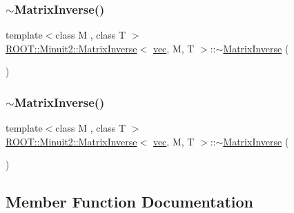 \subsubsection{\texorpdfstring{$\sim$MatrixInverse()}{~MatrixInverse()}\hspace{0.1cm}{\footnotesize\ttfamily [1/2]}}
{\footnotesize\ttfamily template$<$class M , class T $>$ \\
\mbox{\hyperlink{classROOT_1_1Minuit2_1_1MatrixInverse}{R\+O\+O\+T\+::\+Minuit2\+::\+Matrix\+Inverse}}$<$ \mbox{\hyperlink{classROOT_1_1Minuit2_1_1vec}{vec}}, M, T $>$\+::$\sim$\mbox{\hyperlink{classROOT_1_1Minuit2_1_1MatrixInverse}{Matrix\+Inverse}} (\begin{DoxyParamCaption}{ }\end{DoxyParamCaption})\hspace{0.3cm}{\ttfamily [inline]}}

\mbox{\label{classROOT_1_1Minuit2_1_1MatrixInverse_3_01vec_00_01M_00_01T_01_4_ad267e62bc46dd1bab57b3194bd850be9}} 
\subsubsection{\texorpdfstring{$\sim$MatrixInverse()}{~MatrixInverse()}\hspace{0.1cm}{\footnotesize\ttfamily [2/2]}}
{\footnotesize\ttfamily template$<$class M , class T $>$ \\
\mbox{\hyperlink{classROOT_1_1Minuit2_1_1MatrixInverse}{R\+O\+O\+T\+::\+Minuit2\+::\+Matrix\+Inverse}}$<$ \mbox{\hyperlink{classROOT_1_1Minuit2_1_1vec}{vec}}, M, T $>$\+::$\sim$\mbox{\hyperlink{classROOT_1_1Minuit2_1_1MatrixInverse}{Matrix\+Inverse}} (\begin{DoxyParamCaption}{ }\end{DoxyParamCaption})\hspace{0.3cm}{\ttfamily [inline]}}



\subsection{Member Function Documentation}
\mbox{\label{classROOT_1_1Minuit2_1_1MatrixInverse_3_01vec_00_01M_00_01T_01_4_a9d034050e7fbadfbbf24613a54c8ed93}} 
